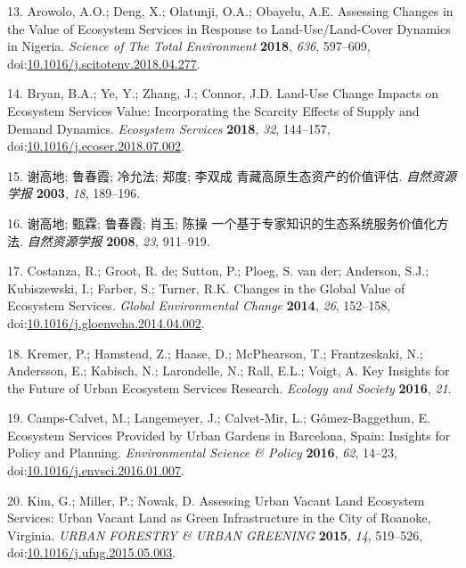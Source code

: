 \documentclass[
]{article}
\begin{document}
\leavevmode\hypertarget{ref-arowolo_assessing_2018}{}%
13. Arowolo, A.O.; Deng, X.; Olatunji, O.A.; Obayelu, A.E. Assessing Changes in the Value of Ecosystem Services in Response to Land-Use/Land-Cover Dynamics in Nigeria. \emph{Science of The Total Environment} \textbf{2018}, \emph{636}, 597--609, doi:\href{https://doi.org/10.1016/j.scitotenv.2018.04.277}{10.1016/j.scitotenv.2018.04.277}.

\leavevmode\hypertarget{ref-bryan_land-use_2018}{}%
14. Bryan, B.A.; Ye, Y.; Zhang, J.; Connor, J.D. Land-Use Change Impacts on Ecosystem Services Value: Incorporating the Scarcity Effects of Supply and Demand Dynamics. \emph{Ecosystem Services} \textbf{2018}, \emph{32}, 144--157, doi:\href{https://doi.org/10.1016/j.ecoser.2018.07.002}{10.1016/j.ecoser.2018.07.002}.

\leavevmode\hypertarget{ref-__2003-3}{}%
15. 谢高地; 鲁春霞; 冷允法; 郑度; 李双成 青藏高原生态资产的价值评估. \emph{自然资源学报} \textbf{2003}, \emph{18}, 189--196.

\leavevmode\hypertarget{ref-__2008-2}{}%
16. 谢高地; 甄霖; 鲁春霞; 肖玉; 陈操 一个基于专家知识的生态系统服务价值化方法. \emph{自然资源学报} \textbf{2008}, \emph{23}, 911--919.

\leavevmode\hypertarget{ref-costanza_changes_2014}{}%
17. Costanza, R.; Groot, R. de; Sutton, P.; Ploeg, S. van der; Anderson, S.J.; Kubiszewski, I.; Farber, S.; Turner, R.K. Changes in the Global Value of Ecosystem Services. \emph{Global Environmental Change} \textbf{2014}, \emph{26}, 152--158, doi:\href{https://doi.org/10.1016/j.gloenvcha.2014.04.002}{10.1016/j.gloenvcha.2014.04.002}.

\leavevmode\hypertarget{ref-kremer_key_2016}{}%
18. Kremer, P.; Hamstead, Z.; Haase, D.; McPhearson, T.; Frantzeskaki, N.; Andersson, E.; Kabisch, N.; Larondelle, N.; Rall, E.L.; Voigt, A. Key Insights for the Future of Urban Ecosystem Services Research. \emph{Ecology and Society} \textbf{2016}, \emph{21}.

\leavevmode\hypertarget{ref-camps-calvet_ecosystem_2016}{}%
19. Camps-Calvet, M.; Langemeyer, J.; Calvet-Mir, L.; Gómez-Baggethun, E. Ecosystem Services Provided by Urban Gardens in Barcelona, Spain: Insights for Policy and Planning. \emph{Environmental Science \& Policy} \textbf{2016}, \emph{62}, 14--23, doi:\href{https://doi.org/10.1016/j.envsci.2016.01.007}{10.1016/j.envsci.2016.01.007}.

\leavevmode\hypertarget{ref-kim_assessing_2015}{}%
20. Kim, G.; Miller, P.; Nowak, D. Assessing Urban Vacant Land Ecosystem Services: Urban Vacant Land as Green Infrastructure in the City of Roanoke, Virginia. \emph{URBAN FORESTRY \& URBAN GREENING} \textbf{2015}, \emph{14}, 519--526, doi:\href{https://doi.org/10.1016/j.ufug.2015.05.003}{10.1016/j.ufug.2015.05.003}.
\end{document}
